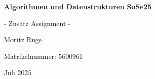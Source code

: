 \begin{titlepage}
    \centering
    \vspace*{3cm}
    {\Huge\bfseries Algorithmen und Datenstrukturen SoSe25 \par}
    \vspace{0.5cm}
    {\Huge - Zusatz Assignment - \par}
    \vspace{1cm}
    {\Large Moritz Ruge \par}
    \vspace{0.1cm}
    {\small Matrikelnummer: 5600961 \par}
    \vfill
    {\large Juli 2025}
\end{titlepage}